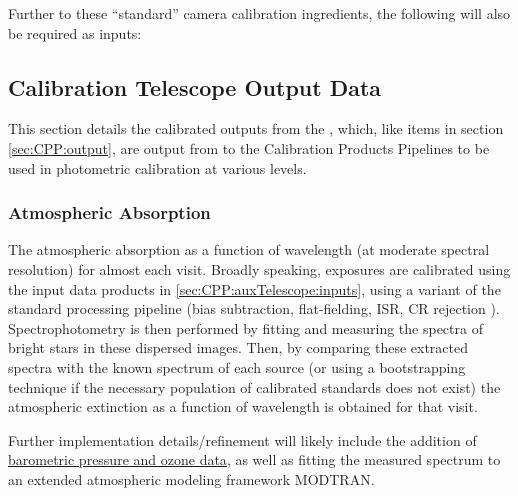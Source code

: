 Further to these ``standard'' camera calibration ingredients, the following will also be required as inputs:








\subsection{Calibration Telescope Output Data}
\label{sec:CPP:auxTelescope:outputs}
This section details the calibrated outputs from the \auxtelescope, which, like items in section \secsymbol\ref{sec:CPP:output}, are output from to the Calibration Products Pipelines to be used in photometric calibration at various levels.


\subsubsection{Atmospheric Absorption}\label{sec:CPP:aux:atmosphericAbsorption}
The atmospheric absorption as a function of wavelength (at moderate spectral resolution) for almost each visit.
\alg Broadly speaking, exposures are calibrated using the input data products in \secsymbol\ref{sec:CPP:auxTelescope:inputs}, using a variant of the standard processing pipeline (bias subtraction, flat-fielding, ISR, CR rejection \etc). Spectrophotometry is then performed by fitting and measuring the spectra of bright stars in these dispersed images. Then, by comparing these extracted spectra with the known spectrum of each source (or using a bootstrapping technique if the necessary population of calibrated standards does not exist) the atmospheric extinction as a function of wavelength is obtained for that visit.

Further implementation details/refinement will likely include the addition of \hyperref[sec:CPP:inputs:atmosphericData]{barometric pressure and ozone data}, as well as fitting the measured spectrum to an extended atmospheric modeling framework \eg MODTRAN. 


